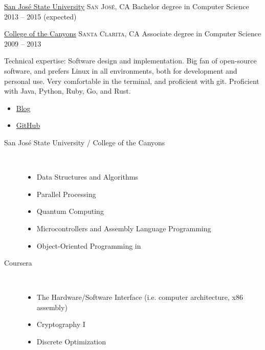 \documentclass[10pt]{article}
\begin{document}
\spacedhrule{-0.2em}{-0.4em}


\headedsection
  {\href{http://www.sjsu.edu/}{San Jos\'{e} State University}}
  {\textsc{San Jos\'{e}, CA}} {%
  \headedsubsection
    {Bachelor degree in Computer Science}
    {2013 -- 2015 (expected)}
    {}
}

\headedsection
  {\href{http://www.canyons.edu/}{College of the Canyons}}
  {\textsc{Santa Clarita, CA}} {%
  \headedsubsection
    {Associate degree in Computer Science}
    {2009 -- 2013} {}
}

\spacedhrule{0.5em}{-0.4em}


\inlineheadsection  %
  {Technical expertise:}
  {Software design and implementation. Big fan of open-source software, and prefers Linux in all environments, both for development and personal use. Very comfortable in the terminal, and proficient with git. Proficient with Java, Python, Ruby, Go, and Rust.}

\pagebreak

\begin{itemize}
	\item{\href{http://dead10ck.github.io/}{Blog}}
	\item{\href{https://github.com/dead10ck}{GitHub}}
\end{itemize}


\begin{multicols}{2}
	\begin{description}
		\item[\hspace{1em} San Jos\'{e} State University / College of the Canyons]{ \hfill \\[-1.5em]
		\begin{itemize}
			\item{Data Structures and Algorithms}
			\item{Parallel Processing}
			\item{Quantum Computing}
			\item{Microcontrollers and Assembly Language Programming}
			\item{Object-Oriented Programming in \CPP}
		\end{itemize}
		}
	\end{description}
	\begin{description}
		\item[\hspace{1em} Coursera]{ \hfill \\[-1.5em]
		\begin{itemize}
			\item{The Hardware/Software Interface (i.e. computer architecture, x86 assembly)}
			\item{Cryptography I}
			\item{Discrete Optimization}
		\end{itemize}
		}
	\end{description}
\end{multicols}
\end{document}
